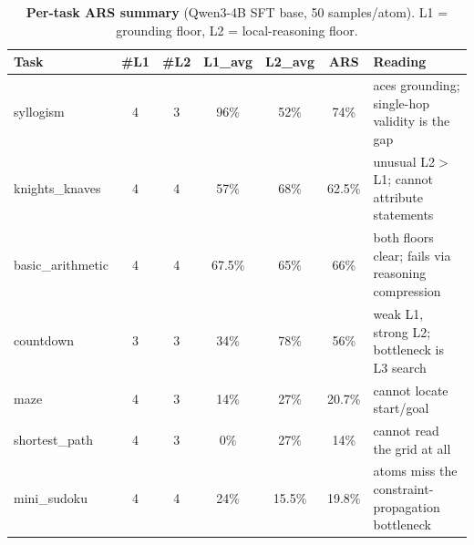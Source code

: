 \documentclass{article}
\begin{document}
\begin{table}[h]
\centering\small
\caption{\textbf{Per-task ARS summary} (Qwen3-4B SFT base, 50 samples/atom). L1 = grounding floor,
L2 = local-reasoning floor.}
\begin{tabular}{lcccccl}
\toprule
Task & \#L1 & \#L2 & L1\_avg & L2\_avg & ARS & Reading\\
\midrule
syllogism        & 4 & 3 & 96\%   & 52\%   & 74\%   & aces grounding; single-hop validity is the gap\\
knights\_knaves  & 4 & 4 & 57\%   & 68\%   & 62.5\% & unusual L2$>$L1; cannot attribute statements\\
basic\_arithmetic& 4 & 4 & 67.5\% & 65\%   & 66\%   & both floors clear; fails via reasoning compression\\
countdown        & 3 & 3 & 34\%   & 78\%   & 56\%   & weak L1, strong L2; bottleneck is L3 search\\
maze             & 4 & 3 & 14\%   & 27\%   & 20.7\% & cannot locate start/goal\\
shortest\_path   & 4 & 3 & 0\%    & 27\%   & 14\%   & cannot read the grid at all\\
mini\_sudoku     & 4 & 4 & 24\%   & 15.5\% & 19.8\% & atoms miss the constraint-propagation bottleneck\\
\bottomrule
\end{tabular}
\end{table}
\end{document}
